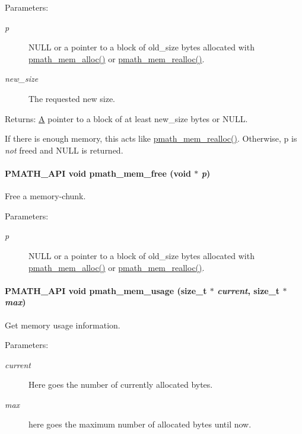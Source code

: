 \begin{Desc}
\item[Parameters:]
\begin{description}
\item[{\em p}]NULL or a pointer to a block of old\_\-size bytes allocated with \hyperlink{group__memory_g856c326c830629de5637912fa8bc2bc9}{pmath\_\-mem\_\-alloc()} or \hyperlink{group__memory_g59dc67a7de0dc3111dfb0424df8d8244}{pmath\_\-mem\_\-realloc()}. \item[{\em new\_\-size}]The requested new size. \end{description}
\end{Desc}
\begin{Desc}
\item[Returns:]\hyperlink{class_a}{A} pointer to a block of at least new\_\-size bytes or NULL.\end{Desc}
If there is enough memory, this acts like \hyperlink{group__memory_g59dc67a7de0dc3111dfb0424df8d8244}{pmath\_\-mem\_\-realloc()}. Otherwise, p is {\em not\/} freed and NULL is returned. \hypertarget{group__memory_g936d3001151c35052812e597eb7dce4f}{
\paragraph[{pmath\_\-mem\_\-free}]{\setlength{\rightskip}{0pt plus 5cm}PMATH\_\-API void pmath\_\-mem\_\-free (void $\ast$ {\em p})}\hfill}
\label{group__memory_g936d3001151c35052812e597eb7dce4f}


Free a memory-chunk. 

\begin{Desc}
\item[Parameters:]
\begin{description}
\item[{\em p}]NULL or a pointer to a block of old\_\-size bytes allocated with \hyperlink{group__memory_g856c326c830629de5637912fa8bc2bc9}{pmath\_\-mem\_\-alloc()} or \hyperlink{group__memory_g59dc67a7de0dc3111dfb0424df8d8244}{pmath\_\-mem\_\-realloc()}. \end{description}
\end{Desc}
\hypertarget{group__memory_gfabd51edae8c23c11efdc4540d7b6a0d}{
\paragraph[{pmath\_\-mem\_\-usage}]{\setlength{\rightskip}{0pt plus 5cm}PMATH\_\-API void pmath\_\-mem\_\-usage (size\_\-t $\ast$ {\em current}, \/  size\_\-t $\ast$ {\em max})}\hfill}
\label{group__memory_gfabd51edae8c23c11efdc4540d7b6a0d}


Get memory usage information. 

\begin{Desc}
\item[Parameters:]
\begin{description}
\item[{\em current}]Here goes the number of currently allocated bytes. \item[{\em max}]here goes the maximum number of allocated bytes until now. \end{description}
\end{Desc}
